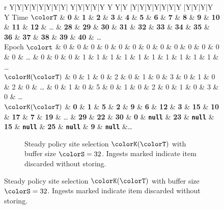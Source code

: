 \begin{figure}[htbp!]
  \centering

\begin{minipage}{\textwidth}
  \scriptsize
  \setlength{\tabcolsep}{2.5pt}
  \begin{tabularx}{\textwidth}{
    r
    Y|Y|Y|Y|Y|Y|Y|Y|
    Y|Y|Y|Y|Y Y Y|Y
    |Y|Y|Y|Y|Y|Y|Y
    |Y|Y|Y|Y Y
    }
     { Time $\colorT$} & \textbf{0} & \textbf{1} & \textbf{2} & \textbf{3} & \textbf{4} & \textbf{5} & \textbf{6} & \textbf{7}
    & \textbf{8} & \textbf{9} & \textbf{10} & \textbf{11} & \textbf{12} %
    &  \ldots
    & \textbf{28} & \textbf{29} & \textbf{30} & \textbf{31}
    & \textbf{32} & \textbf{33} & \textbf{34} & \textbf{35}
    & \textbf{36} & \textbf{37} & \textbf{38} & \textbf{39} & \textbf{40}
    & \ldots \\ \hline
   { Epoch $\colort$} & 0 & 0 & 0 & 0 & 0 & 0 & 0 & 0
    & 0 & 0 & 0 & 0 & 0 %
    &  \ldots
    & 0 & 0 & 0 & 1
    & 1 & 1 & 1 & 1
    & 1 & 1 & 1 & 1 & 1
    & \ldots \\
    { \scriptsize$\colorH(\colorT)$} & 0 & 1 & 0 & 2 & 0 & 1 & 0 & 3
    & 0 & 1 & 0 & 2 & 0 %
    &  \ldots
    & 0 & 1 & 0 & 5
    & 0 & 1 & 0 & 2
    & 0 & 1 & 0 & 3 & 0
    & \ldots \\
    \hline
     { \scriptsize $\colorK(\colorT)$} & \textbf{0} & \textbf{1} & \textbf{5} & \textbf{2} & \textbf{9} & \textbf{6} & \textbf{12} & \textbf{3}
     & \textbf{15} & \textbf{10} & \textbf{17} & \textbf{7} & \textbf{19} & \ldots
 & \textbf{29} & \textbf{22} & \textbf{30} & \textbf{0} & {\tiny \texttt{\textbf{null\hphantom{}}}}  %
 & \textbf{23} & {\tiny \texttt{\textbf{null\hphantom{}}}} & \textbf{15}
 & {\tiny \texttt{\textbf{null\hphantom{}}}} & \textbf{25} & {\tiny \texttt{\textbf{null\hphantom{}}}} & \textbf{9} & {\tiny \texttt{\textbf{null\hphantom{}}}}  &\ldots
  \end{tabularx}
\end{minipage}
\begin{subfigure}{\textwidth}
\vspace{-1ex}
\caption{\footnotesize Steady policy site selection $\colorK(\colorT)$ with buffer size $\colorS=32$. Ingests marked \nullval{} indicate item discarded without storing.}
\label{fig:hsurf-steady-implementation-site-selection}
\end{subfigure}


\end{figure}
